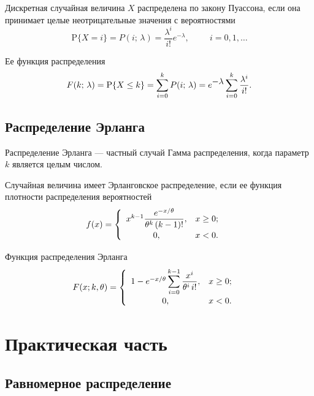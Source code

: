 \documentclass[a4paper,oneside,14pt]{extarticle}
\begin{document}
Дискретная случайная величина $X$ распределена по закону Пуассона, если она принимает целые неотрицательные значения с вероятностями
\[
    \mathrm{P}\{X = i\} = P(i;\, \lambda) = \dfrac{\lambda^i}{i!} e^{\displaystyle -\lambda}, \hspace{1cm} i = 0, 1, \dots
\]

Ее функция распределения
\[
    F(k;\, \lambda) = \mathrm{P}\{X \leq k\} = \sum\displaylimits_{i = 0}^k P(i;\, \lambda) = e^{\displaystyle -\lambda} \sum\displaylimits_{i = 0}^k \dfrac{\lambda^i}{i!}.
\]

\subsection{Распределение Эрланга}

Распределение Эрланга --- частный случай Гамма распределения, когда параметр $k$ является целым числом.

Случайная величина имеет Эрланговское распределение, если ее функция плотности распределения вероятностей 
\[
    f(x) =
    \begin{cases}
        \begin{array}{c l}
            x^{k-1}\dfrac{e^{-x/\theta}}{\theta^k \,(k-1)!}, & x \geq 0; \\
            0, & x < 0.
        \end{array}
    \end{cases}
\]

Функция распределения Эрланга
\[
    F(x; k, \theta) =
    \begin{cases}
        \begin{array}{c l}
            1 - e^{-x/\theta} \displaystyle \sum\displaylimits_{i = 0}^{k - 1} \dfrac{x^i}{\theta^i \,i!}, & x \geq 0; \\
            0, & x < 0.
        \end{array}
    \end{cases}
\]

\newpage

\section{Практическая часть}

\subsection{Равномерное распределение}
\end{document}
